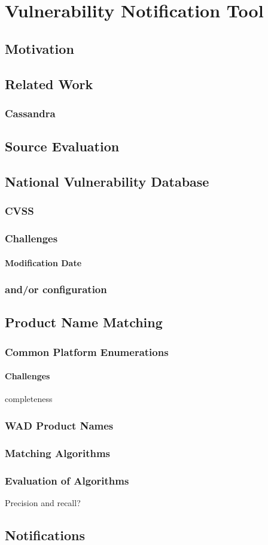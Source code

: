 \chapter{Vulnerability Notification Tool}
\label{chap5-vulnerability-notification-tool}
\thispagestyle{empty}

\section{Motivation}

\section{Related Work}
\subsection{Cassandra}

\section{Source Evaluation}

\section{National Vulnerability Database}
\subsection{CVSS}
\subsection{Challenges}
\subsubsection{Modification Date}
\subsection{and/or configuration}

\section{Product Name Matching}
\subsection{Common Platform Enumerations}
\subsubsection{Challenges}
completeness
\subsection{WAD Product Names}
\subsection{Matching Algorithms}
\subsection{Evaluation of Algorithms}
Precision and recall?
\section{Notifications}




